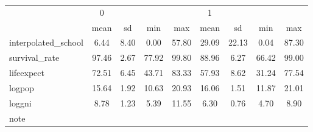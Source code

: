 \begin{tabular}{l*{2}{cccc}}
\toprule
            &           0&            &            &            &           1&            &            &            \\
            &        mean&          sd&         min&         max&        mean&          sd&         min&         max\\
\midrule
interpolated\_school&        6.44&        8.40&        0.00&       57.80&       29.09&       22.13&        0.04&       87.30\\
survival\_rate&       97.46&        2.67&       77.92&       99.80&       88.96&        6.27&       66.42&       99.00\\
lifeexpect  &       72.51&        6.45&       43.71&       83.33&       57.93&        8.62&       31.24&       77.54\\
logpop      &       15.64&        1.92&       10.63&       20.93&       16.06&        1.51&       11.87&       21.01\\
loggni      &        8.78&        1.23&        5.39&       11.55&        6.30&        0.76&        4.70&        8.90\\
\bottomrule
\multicolumn{9}{l}{\footnotesize note}\\
\end{tabular}

